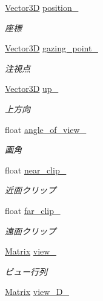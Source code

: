 \begin{DoxyCompactItemize}
\item 
\mbox{\hyperlink{class_vector3_d}{Vector3D}} \mbox{\hyperlink{class_camera_a0a3450c7cdfaa59456d92779ac9ea574}{position\+\_\+}}
\begin{DoxyCompactList}\small\item\em 座標 \end{DoxyCompactList}\item 
\mbox{\hyperlink{class_vector3_d}{Vector3D}} \mbox{\hyperlink{class_camera_a6db99b83e2e2cc8e4284d1885dbbb31f}{gazing\+\_\+point\+\_\+}}
\begin{DoxyCompactList}\small\item\em 注視点 \end{DoxyCompactList}\item 
\mbox{\hyperlink{class_vector3_d}{Vector3D}} \mbox{\hyperlink{class_camera_a8df7d311c10a0c640ac480cb5cbada83}{up\+\_\+}}
\begin{DoxyCompactList}\small\item\em 上方向 \end{DoxyCompactList}\item 
float \mbox{\hyperlink{class_camera_a76b515411d8c1b2dc0dbbace1b82c0a7}{angle\+\_\+of\+\_\+view\+\_\+}}
\begin{DoxyCompactList}\small\item\em 画角 \end{DoxyCompactList}\item 
float \mbox{\hyperlink{class_camera_a33867fed5ea7fe064fd7df9eb9d08bac}{near\+\_\+clip\+\_\+}}
\begin{DoxyCompactList}\small\item\em 近面クリップ \end{DoxyCompactList}\item 
float \mbox{\hyperlink{class_camera_afa256bca85bfb0739e5c2822d853117e}{far\+\_\+clip\+\_\+}}
\begin{DoxyCompactList}\small\item\em 遠面クリップ \end{DoxyCompactList}\item 
\mbox{\hyperlink{class_matrix}{Matrix}} \mbox{\hyperlink{class_camera_aed93b5c4ec9e79379d84ade0d2ae90d4}{view\+\_\+}}
\begin{DoxyCompactList}\small\item\em ビュー行列 \end{DoxyCompactList}\item 
\mbox{\hyperlink{class_matrix}{Matrix}} \mbox{\hyperlink{class_camera_a572a7293b43cdfa079999a24a2c433f0}{view\+\_\+D\+\_\+}}

\end{DoxyCompactItemize}
